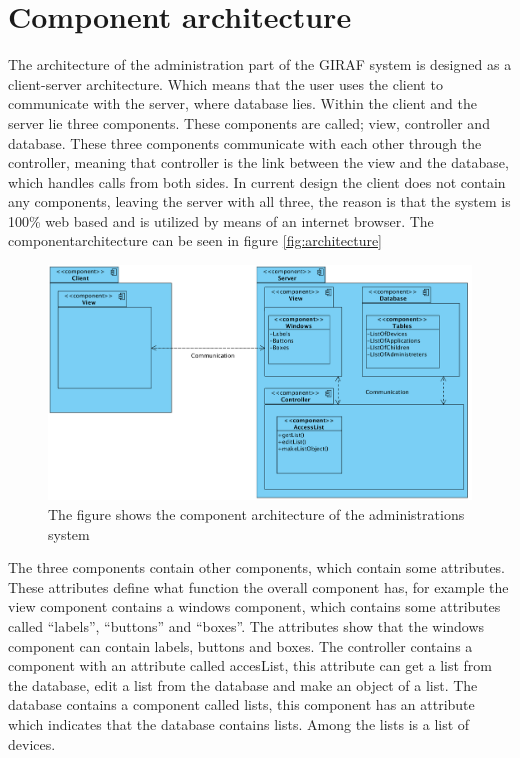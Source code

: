 \section{Component architecture}

The architecture of the administration part of the GIRAF system is designed as a client-server architecture. Which means that the user uses the client to communicate with the server, where database lies. Within the client and the server lie three components. These components are called; view, controller and database. These three components communicate with each other through the controller, meaning that controller is the link between the view and the database, which handles calls from both sides. In current design the client does not contain any components, leaving the server with all three, the reason is that the system is 100\% web based and is utilized by means of an internet browser. The componentarchitecture can be seen in figure \vref{fig:architecture}

\begin{figure}[!ht]
\centering
\includegraphics[width=1.0\textwidth]{img/ComponentArketektur.png}
\caption{The figure shows the component architecture of the administrations system}
\label{fig:architecture}
\end{figure}

The three components contain other components, which contain some attributes. These attributes define what function the overall component has, for example the view component contains a windows component, which contains some attributes called ``labels'', ``buttons'' and ``boxes''. The attributes show that the windows component can contain labels, buttons and boxes.
The controller contains a component with an attribute called accesList, this attribute can get a list from the database, edit a list from the database and make an object of a list.
The database contains a component called lists, this component has an attribute which indicates that the database contains lists. Among the lists is a list of devices.